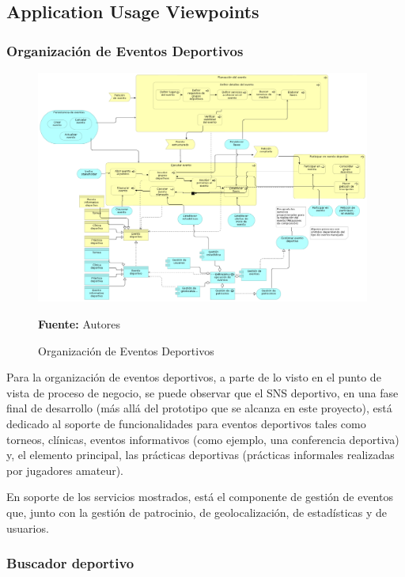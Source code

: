 \subsection{Application Usage Viewpoints}

\subsubsection{Organización de Eventos Deportivos}

\begin{figure}[!htb]
  \begin{center}
    \includegraphics[width=11cm]{./imagenes/Archimate/vistas/application_usage/organizacioneventosdeportivos.png}
    \caption{Organización de Eventos Deportivos}
    \label{fig:au_organizacion_eventos_deportivos}
    \textbf{Fuente:}  Autores
  \end{center}
\end{figure}

Para la organización de eventos deportivos, a parte de lo visto en el punto de vista de proceso de negocio, se puede observar que el SNS deportivo, en una fase final de desarrollo (más allá del prototipo que se alcanza en este proyecto), está dedicado al soporte de funcionalidades para eventos deportivos tales como torneos, clínicas, eventos informativos (como ejemplo, una conferencia deportiva) y, el elemento principal, las prácticas deportivas (prácticas informales realizadas por jugadores amateur).

En soporte de los servicios mostrados, está el componente de gestión de eventos que, junto con la gestión de patrocinio, de geolocalización, de estadísticas y de usuarios.

\subsubsection{Buscador deportivo}

